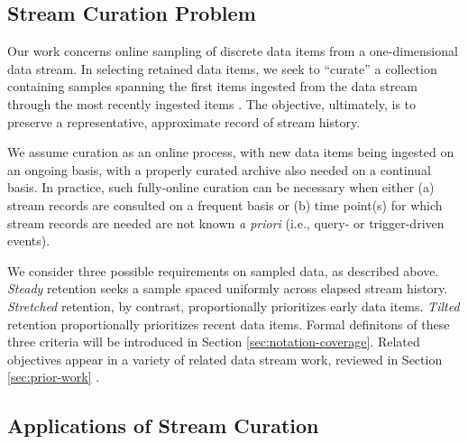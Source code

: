 \subsection{Stream Curation Problem}

Our work concerns online sampling of discrete data items from a one-dimensional data stream.
In selecting retained data items, we seek to ``curate'' a collection containing samples spanning the first items ingested from the data stream through the most recently ingested items \citep{moreno2024algorithms}.
The objective, ultimately, is to preserve a representative, approximate record of stream history.

We assume curation as an online process, with new data items being ingested on an ongoing basis, with a properly curated archive also needed on a continual basis.
In practice, such fully-online curation can be necessary when either (a) stream records are consulted on a frequent basis or (b) time point(s) for which stream records are needed are not known \textit{a priori} (i.e., query- or trigger-driven events).



We consider three possible requirements on sampled data, as described above.
\textit{{Steady}} retention seeks a sample spaced uniformly across elapsed stream history.
\textit{{Stretched}} retention, by contrast, proportionally prioritizes early data items.
\textit{{Tilted}} retention proportionally prioritizes recent data items.
Formal definitons of these three criteria will be introduced in Section \ref{sec:notation-coverage}.
Related objectives appear in a variety of related data stream work, reviewed in Section \ref{sec:prior-work} \citep{aggarwal2003framework,han2005stream}.


\subsection{Applications of Stream Curation}

